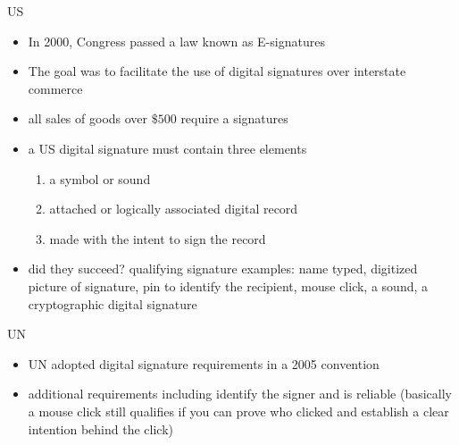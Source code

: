 \documentclass[handout]{beamer}
\begin{document}
\begin{frame}{US}
  \begin{itemize}
    \item \pause In 2000, Congress passed a law known as E-signatures
    \item \pause The goal was to facilitate the use of digital signatures over interstate commerce
    \item \pause all sales of goods over \(\$500\) require a signatures
    \item \pause a US digital signature must contain three elements
    \begin{enumerate}
      \item \pause a symbol or sound
      \item \pause attached or logically associated digital record 
      \item \pause made with the intent to sign the record 
    \end{enumerate}
    \item \pause did they succeed? \pause qualifying signature examples: name typed, digitized picture of signature, pin to identify the recipient, mouse click, a sound, a cryptographic digital signature
  \end{itemize}
\end{frame}

\begin{frame}{UN}
  \begin{itemize}
    \item \pause UN adopted digital signature requirements in a 2005 convention
    \item \pause additional requirements including identify the signer and is reliable (basically a mouse click still qualifies if you can prove who clicked and establish a clear intention behind the click)
  \end{itemize}
\end{frame}
\end{document}
